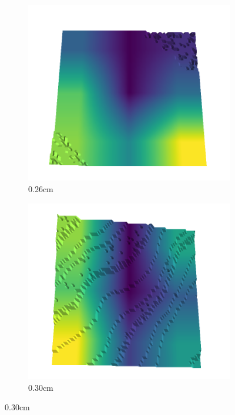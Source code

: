 \begin{figure}[H]
\begin{subfigure}[b]{0.192\linewidth}
    \includegraphics[width=\linewidth]{../img/5/quarry/best/25-patch-3d-majavi-colormap-10.png}
    \caption{0.26cm}
    \label{fig : quarry-best-1}
    \end{subfigure}
    \begin{subfigure}[b]{0.192\linewidth}
    \includegraphics[width=\linewidth]{../img/5/quarry/best/30-patch-3d-majavi-colormap-20.png}
    \caption{0.30cm}
    \label{fig : quarry-best-2}
    \end{subfigure}

\end{figure}
